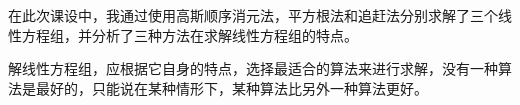 在此次课设中，我通过使用高斯顺序消元法，平方根法和追赶法分别求解了三个线性方程组，并分析了三种方法在求解线性方程组的特点。

解线性方程组，应根据它自身的特点，选择最适合的算法来进行求解，没有一种算法是最好的，只能说在某种情形下，某种算法比另外一种算法更好。
